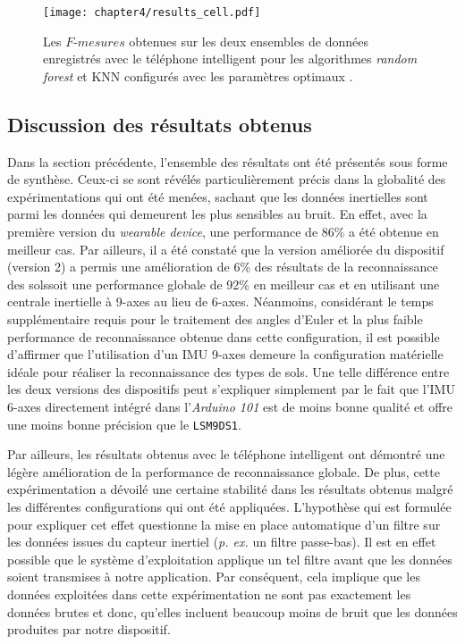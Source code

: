 \begin{figure}[H]
	\centering
	\texttt{[image: chapter4/results\_cell.pdf]}
        \caption[Les $F\mbox{-} mesures$ obtenues sur les deux ensembles de données enregistrés avec le téléphone intelligent pour les algorithmes \textit{random forest} et \acs{KNN} configurés avec les paramètres optimaux.]{Les $F\mbox{-} mesures$ obtenues sur les deux ensembles de données enregistrés avec le téléphone intelligent pour les algorithmes \textit{random forest} et \acs{KNN} configurés avec les paramètres optimaux \citep{Thullier2017}.}
	\label{fig:results_cell}
\end{figure}

\subsection{Discussion des résultats obtenus}

Dans la section précédente, l'ensemble des résultats ont été présentés sous forme de synthèse. Ceux-ci se sont révélés particulièrement précis dans la globalité des expérimentations qui ont été menées, sachant que les données inertielles sont parmi les données qui demeurent les plus sensibles au bruit. En effet, avec la première version du \textit{wearable device}, une performance de 86\% a été obtenue en meilleur cas. Par ailleurs, il a été constaté que la version améliorée du dispositif (version 2) a permis une amélioration de 6\% des résultats de la reconnaissance des sols\textemdash soit une performance globale de 92\% en meilleur cas et en utilisant une centrale inertielle à 9-axes au lieu de 6-axes. Néanmoins, considérant le temps supplémentaire requis pour le traitement des angles d'Euler et la plus faible performance de reconnaissance obtenue dans cette configuration, il est possible d'affirmer que l'utilisation d'un \acs{IMU} 9-axes demeure la configuration matérielle idéale pour réaliser la reconnaissance des types de sols. Une telle différence entre les deux versions des dispositifs peut s'expliquer simplement par le fait que l'\acs{IMU} 6-axes directement intégré dans l'\textit{Arduino 101} est de moins bonne qualité et offre une moins bonne précision que le \texttt{LSM9DS1}.

Par ailleurs, les résultats obtenus avec le téléphone intelligent ont démontré une légère amélioration de la performance de reconnaissance globale. De plus, cette expérimentation a dévoilé une certaine stabilité dans les résultats obtenus malgré les différentes configurations qui ont été appliquées. L'hypothèse qui est formulée pour expliquer cet effet questionne la mise en place automatique d'un filtre sur les données issues du capteur inertiel (\textit{p. ex.} un filtre passe-bas). Il est en effet possible que le système d'exploitation applique un tel filtre avant que les données soient transmises à notre application. Par conséquent, cela implique que les données exploitées dans cette expérimentation ne sont pas exactement les données brutes et donc, qu'elles incluent beaucoup moins de bruit que les données produites par notre dispositif.

